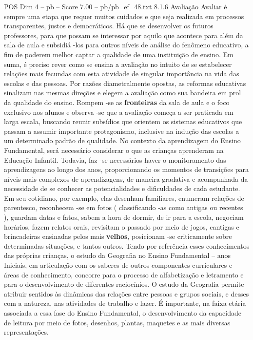 \begin{textsample}{POS Dim 4 – pb – Score 7.00 – pb/pb\_ef\_48.txt}  \label{ex:f4_pos_269}
8.1.6 Avaliação Avaliar é sempre uma etapa que requer muitos cuidados e que seja realizada em processos transparentes, justos e democráticos.
Há que se desenvolver os futuros professores, para que possam se interessar por aquilo que acontece para além da sala de aula e subsidiá -los para outros níveis de análise do fenômeno educativo, a fim de poderem melhor captar a qualidade de uma instituição de ensino.
Em suma, é preciso rever como se ensina a avaliação no intuito de se estabelecer relações mais fecundas com esta atividade de singular importância na vida das escolas e das pessoas.
Por razões diametralmente opostas, as reformas educativas sinalizam nas mesmas direções e elegem a avaliação como sua bandeira em prol da qualidade do ensino.
Rompem -se as \textbf{fronteiras} da sala de aula e o foco exclusivo nos alunos e observa -se que a avaliação começa a ser praticada em larga escala, buscando reunir subsídios que orientem os sistemas educativos que passam a assumir importante protagonismo, inclusive na indução das escolas a um determinado padrão de qualidade.
No contexto da aprendizagem do Ensino Fundamental, será necessário considerar o que as crianças aprenderam na Educação Infantil.
Todavia, faz -se necessários haver o monitoramento das aprendizagens ao longo dos anos, proporcionando os momentos de transições para níveis mais complexos de aprendizagens, de maneira gradativa e acompanhada da necessidade de se conhecer as potencialidades e dificuldades de cada estudante.
Em seu cotidiano, por exemplo, elas desenham familiares, enumeram relações de parentesco, reconhecem -se em fotos ( classificando -as como antigas ou recentes ), guardam datas e fatos, sabem a hora de dormir, de ir para a escola, negociam horários, fazem relatos orais, revisitam o passado por meio de jogos, cantigas e brincadeiras ensinadas pelos mais \textbf{velhos}, posicionam -se criticamente sobre determinadas situações, e tantos outros.
Tendo por referência esses conhecimentos das próprias crianças, o estudo da Geografia no Ensino Fundamental – anos Iniciais, em articulação com os saberes de outros componentes curriculares e áreas de conhecimento, concorre para o processo de alfabetização e letramento e para o desenvolvimento de diferentes raciocínios.
O estudo da Geografia permite atribuir sentidos às dinâmicas das relações entre pessoas e grupos sociais, e desses com a natureza, nas atividades de trabalho e lazer.
É importante, na faixa etária associada a essa fase do Ensino Fundamental, o desenvolvimento da capacidade de leitura por meio de fotos, desenhos, plantas, maquetes e as mais diversas representações.

\end{textsample}
